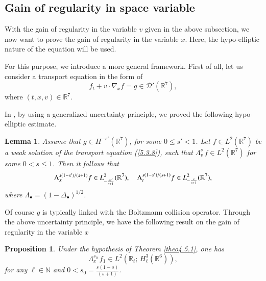 \documentclass{amsart}[12pt, article]
\newtheorem{lemm}[theo]{Lemma}
\newtheorem{prop}[theo]{Proposition}
\begin{document}
\subsection{Gain of regularity in space variable}\label{section6.3}
\setcounter{equation}{0}
 With the gain of regularity in  the variable $v$ given in the
 above subsection, we now want to prove the gain of  regularity in the variable $x$. Here, the hypo-elliptic nature of the  equation will be used.

For this purpose, we introduce a more general framework. First of all, let us consider a transport equation in the form of
\begin{equation}\label{5.3.8}
 f_t + v\cdot\nabla_x f = g \in {{\mathcal D}} '({{{\mathbb R}}}^{7}) ,
\end{equation}
where $(t,x,v) \in  {{{\mathbb R}}}^{7}$.

In
\cite{amuxy-nonlinear-b}, by using a generalized uncertainty
principle, we proved the following hypo-elliptic estimate.

\begin{lemm}\label{lemm5.2.1+0}
Assume that $ g \in H^{-s'} ({{{\mathbb R}}}^{7})$, for some $0\leq s' <1$.
Let $f\in L^2 ({{{\mathbb R}}}^{7}) $ be a weak solution of the transport
equation (\ref{5.3.8}), such that $\Lambda^s_v\, f \in L^2
({{{\mathbb R}}}^{7})$ for some $0<s\leq 1$. Then it follows that
\[
\Lambda_x^{s (1-s')/(s +1)}f\in L^2_{-\frac{s s'}{s +1}}({{{\mathbb R}}}^{7})
, \enskip \enskip \Lambda_t^{s (1-s')/(s +1)}f\in L^2_{-\frac{s}{s
+1}}({{{\mathbb R}}}^{7}),
\]
where $\Lambda_\bullet=(1-\Delta_\bullet)^{1/2}$.
\end{lemm}

Of course $g$ is typically linked with the Boltzmann collision operator. Through the above uncertainty principle, we have the following result on the gain of regularity in the
variable $x$

\begin{prop}\label{prop5.4.1}
Under the hypothesis of Theorem \ref{theo4.5.1}, one has
\begin{equation}\label{5.3.10}
\Lambda^{s_0}_{x}\, f_1\in L^2({{{\mathbb R}}}_t;\, H^3_\ell  ({{{\mathbb R}}}^6)),
\end{equation}
for any $\ell \in{{\mathbb N}}$ and $0<s_0=\frac{s(1-s)}{(s+1)}$.
\end{prop}
\end{document}
